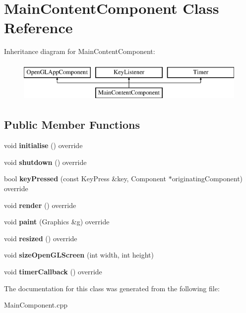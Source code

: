\hypertarget{class_main_content_component}{}\section{Main\+Content\+Component Class Reference}
\label{class_main_content_component}
Inheritance diagram for Main\+Content\+Component\+:\begin{figure}[H]
\begin{center}
\leavevmode
\includegraphics[height=2.000000cm]{class_main_content_component}
\end{center}
\end{figure}
\subsection*{Public Member Functions}
\begin{DoxyCompactItemize}
\item 
\mbox{\label{class_main_content_component_ae9441e15989369e38851d30bd95a158f}} 
void {\bfseries initialise} () override
\item 
\mbox{\label{class_main_content_component_a0673e5add9a096068b962d5801c8b651}} 
void {\bfseries shutdown} () override
\item 
\mbox{\label{class_main_content_component_a71f742aa5a613df26caf9ea11c04d457}} 
bool {\bfseries key\+Pressed} (const Key\+Press \&key, Component $\ast$originating\+Component) override
\item 
\mbox{\label{class_main_content_component_a130f2e9c7d3ea89dc219acd8f3cdae3f}} 
void {\bfseries render} () override
\item 
\mbox{\label{class_main_content_component_a612c0d15d596b7e8bd2ebf1d34be1b9f}} 
void {\bfseries paint} (Graphics \&g) override
\item 
\mbox{\label{class_main_content_component_a60c80d5b4ad606f32c606358956d0fba}} 
void {\bfseries resized} () override
\item 
\mbox{\label{class_main_content_component_ab89712ff59f30167a6c09d2a6daefc27}} 
void {\bfseries size\+Open\+G\+L\+Screen} (int width, int height)
\item 
\mbox{\label{class_main_content_component_a5b7e48a7423f17bc799fc2990f48e38d}} 
void {\bfseries timer\+Callback} () override
\end{DoxyCompactItemize}


The documentation for this class was generated from the following file\+:\begin{DoxyCompactItemize}
\item 
Main\+Component.\+cpp\end{DoxyCompactItemize}
